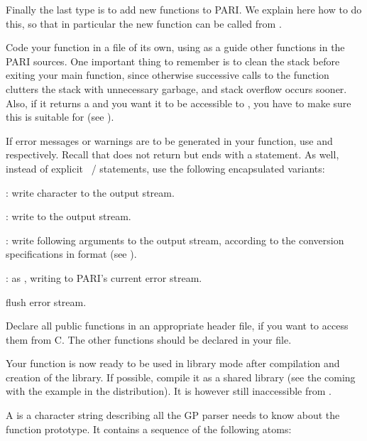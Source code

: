Finally the last type is to add new functions to PARI. We explain here how
to do this, so that in particular the new function can be called from .

\label{se:coding_guidelines}
\noindent
Code your function in a file of its own, using as a guide other functions
in the PARI sources. One important thing to remember is to clean the stack
before exiting your main function, since otherwise successive calls to
the function clutters the stack with unnecessary garbage, and stack
overflow occurs sooner. Also, if it returns a  and you want it
to be accessible to , you have to make sure this  is
suitable for  (see ).

If error messages or warnings are to be generated in your function, use
 and  respectively.
Recall that  does not return but ends with a 
statement. As well, instead of explicit ~/ 
statements, use the following encapsulated variants:

: write character  to the output stream.

: write  to the output stream.

: write following arguments to the
output stream, according to the conversion specifications in format 
(see ).

: as , writing to
PARI's current error stream.

 flush error stream.

Declare all public functions in an appropriate header file, if you
want to access them from C. The other functions should be declared
 in your file.

Your function is now ready to be used in library mode after compilation and
creation of the library. If possible, compile it as a shared library (see
the  coming with the  example in the
distribution). It is however still inaccessible from .\smallskip

\label{se:gp.interface}
A  is a character string describing all the GP parser needs
to know about the function prototype. It contains a sequence of the following
atoms:

